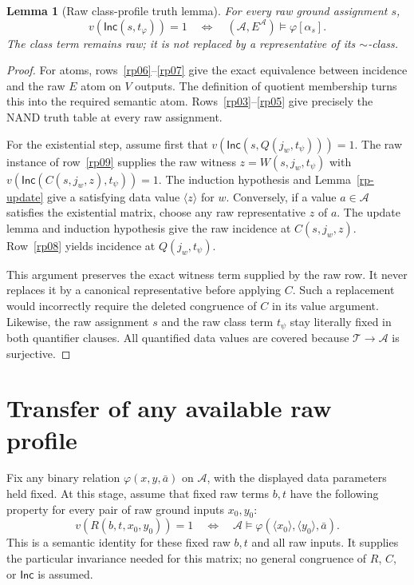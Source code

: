 \documentclass[11pt]{article}
\newtheorem{lemma}[theorem]{Lemma}
\newcommand{\Inc}{\mathsf{Inc}}
\newcommand{\cl}[1]{\langle#1\rangle}
\begin{document}
\begin{lemma}[Raw class-profile truth lemma]\label{rp-truth}
For every raw ground assignment $s$,
\[
 v(\Inc(s,t_\varphi))=1
 \quad\Longleftrightarrow\quad
 (\mathcal A,E^{\mathcal A})\models\varphi[\alpha_s].
\]
The class term remains raw; it is not replaced by a representative of
its $\sim$-class.
\end{lemma}
\begin{proof}
For atoms, rows~\ref{rp06}--\ref{rp07} give the exact equivalence
between incidence and the raw $E$ atom on $V$ outputs. The definition
of quotient membership turns this into the required semantic atom.
Rows~\ref{rp03}--\ref{rp05} give precisely the NAND truth table at
every raw assignment.

For the existential step, assume first that
$v(\Inc(s,Q(j_w,t_\psi)))=1$. The raw instance of row~\ref{rp09}
supplies the raw witness
$z=W(s,j_w,t_\psi)$ with
$v(\Inc(C(s,j_w,z),t_\psi))=1$. The induction hypothesis and
Lemma~\ref{rp-update} give a satisfying data value $\cl z$ for $w$.
Conversely, if a value $a\in\mathcal A$ satisfies the existential
matrix, choose any raw representative $z$ of $a$. The update lemma
and induction hypothesis give the raw incidence at $C(s,j_w,z)$.
Row~\ref{rp08} yields incidence at $Q(j_w,t_\psi)$.

This argument preserves the exact witness term supplied by the raw
row. It never replaces it by a canonical representative before applying
$C$. Such a replacement would incorrectly require the deleted
congruence of $C$ in its value argument. Likewise, the raw assignment
$s$ and the raw class term $t_\psi$ stay literally fixed in both
quantifier clauses. All quantified data values are covered because
$\mathcal T\to\mathcal A$ is surjective.
\end{proof}

\section{Transfer of any available raw profile}

Fix any binary relation $\varphi(x,y,\bar a)$ on $\mathcal A$, with
the displayed data parameters held fixed. At this stage, assume that
fixed raw terms $b,t$ have the following property for every pair of raw
ground inputs $x_0,y_0$:
\begin{equation}\label{rp-Rtruth}
 v(R(b,t,x_0,y_0))=1
 \quad\Longleftrightarrow\quad
 \mathcal A\models\varphi(\cl{x_0},\cl{y_0},\bar a).
\end{equation}
This is a semantic identity for these fixed raw $b,t$ and all raw
inputs. It supplies the particular invariance needed for this matrix;
no general congruence of $R$, $C$, or $\Inc$ is assumed.
\end{document}
